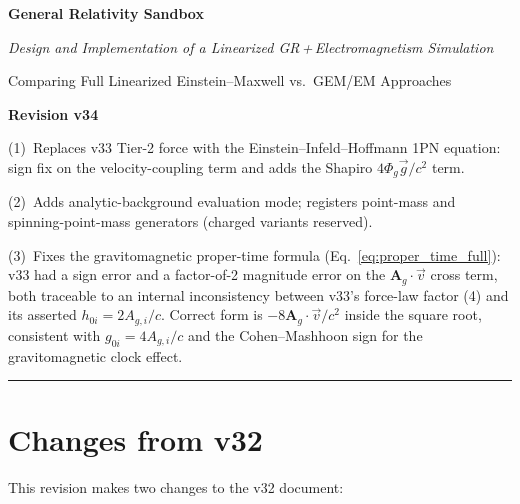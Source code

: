 \documentclass[11pt,a4paper]{article}
\newcommand{\vv}[1]{\mathbf{#1}}
\newcommand{\Ag}{\vv{A}_g}
\begin{document}

\begin{titlepage}
  \centering
  \vspace*{3cm}
  {\Huge\bfseries\color{deepblue} General Relativity Sandbox\par}
  \vspace{0.8cm}
  {\large\itshape Design and Implementation of a Linearized GR\,+\,Electromagnetism Simulation\par}
  \vspace{0.4cm}
  {\normalsize\color{gray} Comparing Full Linearized Einstein--Maxwell vs.\ GEM/EM Approaches\par}
  \vspace{1.2cm}
  {\large\bfseries\color{midblue} Revision v34\par}
  \vspace{0.2cm}
  {\small\color{gray}
  (1)~Replaces v33 Tier-2 force with the Einstein--Infeld--Hoffmann 1PN
  equation: sign fix on the velocity-coupling term and adds the Shapiro
  $4\Phi_g\vec g/c^2$ term.\par
  (2)~Adds analytic-background evaluation mode; registers point-mass and
  spinning-point-mass generators (charged variants reserved).\par
  (3)~Fixes the gravitomagnetic proper-time formula (Eq.~\ref{eq:proper_time_full}):
  v33 had a sign error and a factor-of-2 magnitude error on the
  $\Ag\cdot\vec v$ cross term, both traceable to an internal inconsistency
  between v33's force-law factor (4) and its asserted $h_{0i} = 2A_{g,i}/c$.
  Correct form is $-8\Ag\cdot\vec v/c^2$ inside the square root,
  consistent with $g_{0i} = 4A_{g,i}/c$ and the Cohen--Mashhoon sign for
  the gravitomagnetic clock effect.\par}
  \vspace{1.5cm}
  \hrule
\end{titlepage}

\tableofcontents
\newpage

\section*{Changes from v32}

This revision makes two changes to the v32 document:
\end{document}
